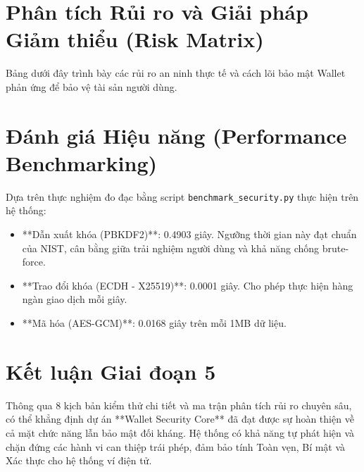 \documentclass[11pt,a4paper]{article}
\begin{document}
\newpage

\section{Phân tích Rủi ro và Giải pháp Giảm thiểu (Risk Matrix)}

Bảng dưới đây trình bày các rủi ro an ninh thực tế và cách lõi bảo mật Wallet phản ứng để bảo vệ tài sản người dùng.

\begin{table}[H]
    \centering
    \caption{Ma trận Đánh giá Rủi ro và Chiến lược phòng thủ của Wallet}
\end{table}

\section{Đánh giá Hiệu năng (Performance Benchmarking)}
Dựa trên thực nghiệm đo đạc bằng script \texttt{benchmark\_security.py} thực hiện trên hệ thống:
\begin{itemize}
    \item **Dẫn xuất khóa (PBKDF2)**: 0.4903 giây. Ngưỡng thời gian này đạt chuẩn của NIST, cân bằng giữa trải nghiệm người dùng và khả năng chống brute-force.
    \item **Trao đổi khóa (ECDH - X25519)**: 0.0001 giây. Cho phép thực hiện hàng ngàn giao dịch mỗi giây.
    \item **Mã hóa (AES-GCM)**: 0.0168 giây trên mỗi 1MB dữ liệu.
\end{itemize}

\section{Kết luận Giai đoạn 5}
Thông qua 8 kịch bản kiểm thử chi tiết và ma trận phân tích rủi ro chuyên sâu, có thể khẳng định dự án **Wallet Security Core** đã đạt được sự hoàn thiện về cả mặt chức năng lẫn bảo mật đối kháng. Hệ thống có khả năng tự phát hiện và chặn đứng các hành vi can thiệp trái phép, đảm bảo tính Toàn vẹn, Bí mật và Xác thực cho hệ thống ví điện tử.
\end{document}
